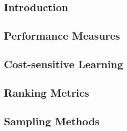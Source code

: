 

\subsection{Introduction}


\subsection{Performance Measures}


\subsection{Cost-sensitive Learning}


\subsection{Ranking Metrics}


\subsection{Sampling Methods}

